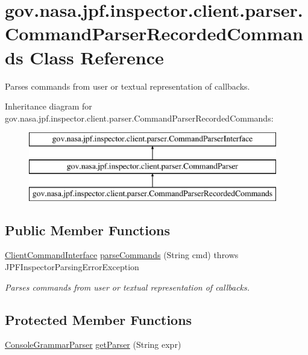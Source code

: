 \hypertarget{classgov_1_1nasa_1_1jpf_1_1inspector_1_1client_1_1parser_1_1_command_parser_recorded_commands}{}\section{gov.\+nasa.\+jpf.\+inspector.\+client.\+parser.\+Command\+Parser\+Recorded\+Commands Class Reference}
\label{classgov_1_1nasa_1_1jpf_1_1inspector_1_1client_1_1parser_1_1_command_parser_recorded_commands}


Parses commands from user or textual representation of callbacks.  


Inheritance diagram for gov.\+nasa.\+jpf.\+inspector.\+client.\+parser.\+Command\+Parser\+Recorded\+Commands\+:\begin{figure}[H]
\begin{center}
\leavevmode
\includegraphics[height=3.000000cm]{classgov_1_1nasa_1_1jpf_1_1inspector_1_1client_1_1parser_1_1_command_parser_recorded_commands}
\end{center}
\end{figure}
\subsection*{Public Member Functions}
\begin{DoxyCompactItemize}
\item 
\hyperlink{interfacegov_1_1nasa_1_1jpf_1_1inspector_1_1client_1_1_client_command_interface}{Client\+Command\+Interface} \hyperlink{classgov_1_1nasa_1_1jpf_1_1inspector_1_1client_1_1parser_1_1_command_parser_recorded_commands_a1c3baa353573d0ba99b2e402b7da5505}{parse\+Commands} (String cmd)  throws J\+P\+F\+Inspector\+Parsing\+Error\+Exception 
\begin{DoxyCompactList}\small\item\em Parses commands from user or textual representation of callbacks. \end{DoxyCompactList}\end{DoxyCompactItemize}
\subsection*{Protected Member Functions}
\begin{DoxyCompactItemize}
\item 
\hyperlink{classgov_1_1nasa_1_1jpf_1_1inspector_1_1client_1_1parser_1_1_console_grammar_parser}{Console\+Grammar\+Parser} \hyperlink{classgov_1_1nasa_1_1jpf_1_1inspector_1_1client_1_1parser_1_1_command_parser_a4f3a71d89c26fff8ef0f3aa1d5c037be}{get\+Parser} (String expr)
\end{DoxyCompactItemize}


